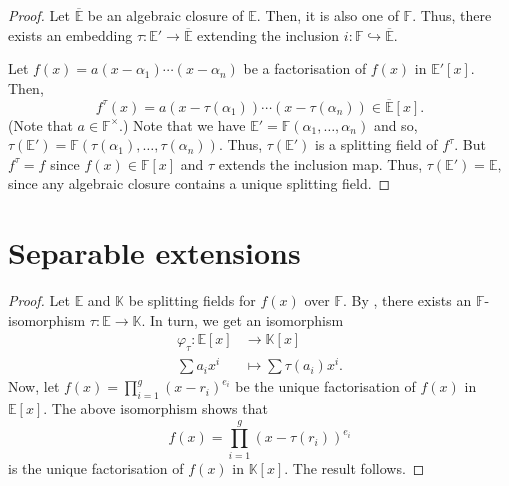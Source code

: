 \isosplitting*\label{thm:isosplitting2}
\begin{flushright}\hyperref[thm:isosplitting]{\upsym}\end{flushright}
\begin{proof}
    Let $\overline{\mathbb{E}}$ be an algebraic closure of $\mathbb{E}.$ Then, it is also one of $\mathbb{F}.$ Thus, there exists an embedding $\tau : \mathbb{E}' \to \overline{\mathbb{E}}$ extending the inclusion $i : \mathbb{F} \hookrightarrow \overline{\mathbb{E}}.$

    Let $f(x) = a(x - \alpha_1) \cdots (x - \alpha_n)$ be a factorisation of $f(x)$ in $\mathbb{E}'[x].$ Then,
    \begin{equation*} 
        f^{\tau}(x) = a(x - \tau(\alpha_1)) \cdots (x - \tau(\alpha_n)) \in \overline{\mathbb{E}}[x].
    \end{equation*}
    (Note that $a \in \mathbb{F}^\times.$)
    Note that we have $\mathbb{E}' = \mathbb{F}(\alpha_1, \ldots, \alpha_n)$ and so, $\tau(\mathbb{E}') = \mathbb{F}(\tau(\alpha_1), \ldots, \tau(\alpha_n)).$ Thus, $\tau(\mathbb{E}')$ is a splitting field of $f^{\tau}.$ But $f^{\tau} = f$ since $f(x) \in \mathbb{F}[x]$ and $\tau$ extends the inclusion map. Thus, $\tau(\mathbb{E}') = \mathbb{E},$ since any algebraic closure contains a unique splitting field.
\end{proof}

\section{Separable extensions}
\multindepsplitting*\label{prop:multindepsplitting2}
\begin{flushright}\hyperref[prop:multindepsplitting]{\upsym}\end{flushright}
\begin{proof}
    Let $\mathbb{E}$ and $\mathbb{K}$ be splitting fields for $f(x)$ over $\mathbb{F}.$ By , there exists an $\mathbb{F}$-isomorphism $\tau : \mathbb{E} \to \mathbb{K}.$ In turn, we get an isomorphism
    \begin{align*} 
        \varphi_\tau : \mathbb{E}[x] &\to \mathbb{K}[x]\\
        \sum a_i x^i &\mapsto \sum \tau(a_i) x^i.
    \end{align*}
    Now, let $f(x) = \prod_{i = 1}^{g}(x - r_i)^{e_i}$ be the unique factorisation of $f(x)$ in $\mathbb{E}[x].$ The above isomorphism shows that 
    \begin{equation*} 
        f(x)= \prod_{i = 1}^{g}(x - \tau(r_i))^{e_i}
    \end{equation*}
    is the unique factorisation of $f(x)$ in $\mathbb{K}[x].$ The result follows.
\end{proof}

